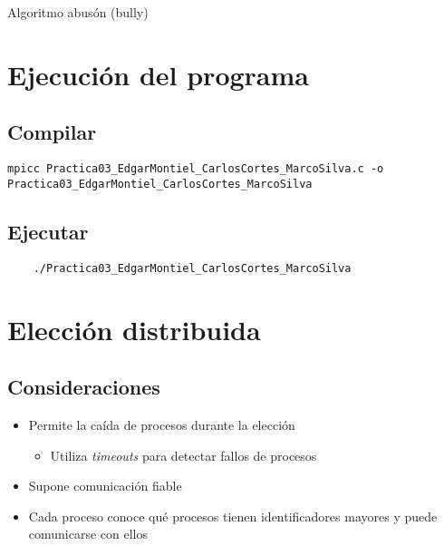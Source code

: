 \documentclass[a4paper,12pt]{article}
\begin{document}


\newpage

\begin{center}
    {\huge Algoritmo abusón (bully)}
\end{center}

\section*{Ejecución del programa}

\subsection*{Compilar}

\begin{small}
    \begin{verbatim}
mpicc Practica03_EdgarMontiel_CarlosCortes_MarcoSilva.c -o Practica03_EdgarMontiel_CarlosCortes_MarcoSilva
    \end{verbatim}            
\end{small}
\subsection*{Ejecutar}
\begin{verbatim}
    ./Practica03_EdgarMontiel_CarlosCortes_MarcoSilva
\end{verbatim}


\section*{Elección distribuida}

\subsection*{Consideraciones}

\begin{itemize}
    \item Permite la caída de procesos durante la elección
     \begin{itemize}
        \item Utiliza \textit{timeouts} para detectar fallos de procesos
     \end{itemize}
    \item Supone comunicación fiable
    \item Cada proceso conoce qué procesos tienen identificadores mayores y puede comunicarse con ellos
\end{itemize}
\end{document}
